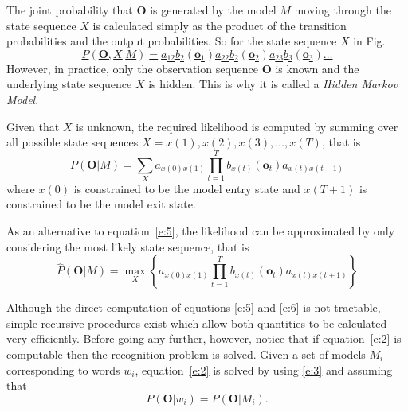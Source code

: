 The joint probability that $\bm{O}$ is generated by the model $M$ moving
through the state sequence
$X$ is calculated simply as the product of the transition
probabilities and the output probabilities.  So for the state sequence $X$ in
Fig.~\href{f:markovgen}
\begin{equation} \label{e:4}
P(\bm{O},X|M) = a_{12} b_2(\bm{o}_1) a_{22} b_2(\bm{o}_2) a_{23} 
           b_3(\bm{o}_3) \ldots
\end{equation}
However, in practice, only the observation sequence 
$\bm{O}$ is known and the
underlying state sequence $X$ is hidden.  This is why it is
called a {\it Hidden Markov Model}.  


Given that $X$ is unknown, the
required likelihood is computed 
by summing over all possible state
sequences $X = x(1), x(2), x(3), \ldots, x(T)$, that is
\begin{equation}  \label{e:5}
P(\bm{O}|M) = \sum_X a_{x(0)x(1)} \prod_{t=1}^T b_{x(t)}(\bm{o}_t)
a_{x(t)x(t+1)} \end{equation}
where $x(0)$ is constrained to be the model entry state and $x(T+1)$
is constrained to be the model exit state.

As an alternative to equation~\ref{e:5}, the likelihood can be
approximated by only considering the most likely state
sequence, that is
\begin{equation} \label{e:6}
\hat{P}(\bm{O}|M) = \max_X \left\{ 
        a_{x(0)x(1)} \prod_{t=1}^T b_{x(t)}(\bm{o}_t) a_{x(t)x(t+1)}
        \right\}
\end{equation}

Although the direct computation of equations \ref{e:5} and \ref{e:6}
is not tractable, simple recursive procedures exist which allow
both quantities to be calculated very efficiently.
Before going any further, however, notice that if equation~\ref{e:2} is
computable then the recognition problem is solved.  Given a set of models
$M_i$ corresponding to words $w_i$, equation~\ref{e:2} is
solved by using \ref{e:3} and assuming that
\begin{equation} \label{e:7}
P(\bm{O}|w_i) = P(\bm{O}|M_i).
\end{equation}


